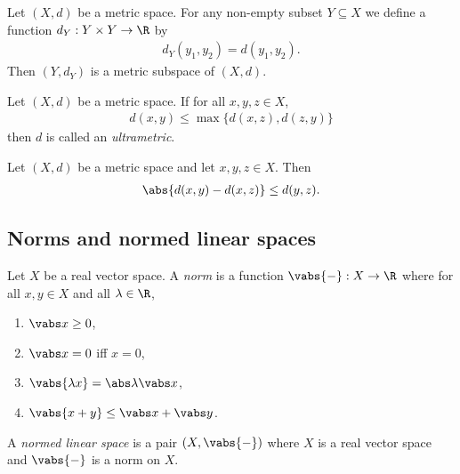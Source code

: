 \documentclass{article}
\begin{document}
\begin{definition}
	Let $(X,d)$ be a metric space. For any non-empty subset $Y\subseteq X$ we define
	a function $d_Y:Y\times Y\to\R$ by
	\begin{align*}
		d_Y(y_1,y_2)=d(y_1,y_2).
	\end{align*}
	Then $(Y,d_Y)$ is a metric subspace of $(X,d)$.
\end{definition}

\begin{definition}[Ultrametric]
	Let $(X,d)$ be a metric space. If for all $x,y,z\in X$,
	\begin{align*}
		d(x,y)\leq \max\{d(x,z),d(z,y)\}
	\end{align*}
	then $d$ is called an \emph{ultrametric}.
\end{definition}

\begin{proposition}
	Let $(X,d)$ be a metric space and let $x,y,z\in X$. Then
	\begin{align*}
		\abs{d(x,y)-d(x,z)}\leq d(y,z).
	\end{align*}
\end{proposition}

\subsection{Norms and normed linear spaces}

\begin{definition}
	Let $X$ be a real vector space. A \emph{norm} is a function $\vabs{-}:X\to\R$
	where for all $x,y\in X$ and all $\lambda\in\R$,
	\begin{enumerate}
		\item $\vabs x \geq 0$,
		\item $\vabs x = 0$ iff $x = 0$,
		\item $\vabs{\lambda x}=\abs \lambda \vabs x$,
		\item $\vabs{x+y}\leq \vabs x +\vabs y$.
	\end{enumerate}
	A \emph{normed linear space} is a pair $(X,\vabs{-})$ where $X$ is a real vector
	space and $\vabs{-}$ is a norm on $X$.
\end{definition}
\end{document}
